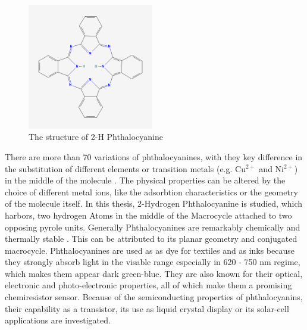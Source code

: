 \begin{figure}
    \centering
    \includegraphics[width=0.49\textwidth]{graphics/Phthalocyanine.png}
    \caption{The structure of 2-H Phthalocyanine \cite{phthalacyanine}}
    \label{fig:phtalo}
\end{figure}

There are more than 70 variations of phthalocyanines, with they key difference in the substitution of different elements or transition metals (e.g. Cu$^{2+}$ and Ni$^{2+}$) in the middle of the molecule \cite{thomas1990phthalocyanine}.
The physical properties can be altered by the choice of different metal ions, like the adsorbtion characteristics or the geometry of the molecule itself. 
In this thesis, 2-Hydrogen Phthalocyanine is studied, which harbors, two hydrogen Atoms in the middle of the Macrocycle attached to two opposing pyrole units.
Generally Phthalocyanines are remarkably chemically and thermally stable \cite{thomas1990phthalocyanine}.
This can be attributed to its planar geometry and conjugated macrocycle.
Phthalocyanines are used as as dye for textiles and as inks because they strongly absorb light in the visable range especially in 620 - 750 nm regime, which makes them appear dark green-blue. 
They are also known for their optical, electronic and photo-electronic properties, all of which make them a promising chemiresistor sensor.
Because of the semiconducting properties of phthalocyanins, their capability as a transistor, its use as liquid crystal display or its solar-cell applications are investigated. 